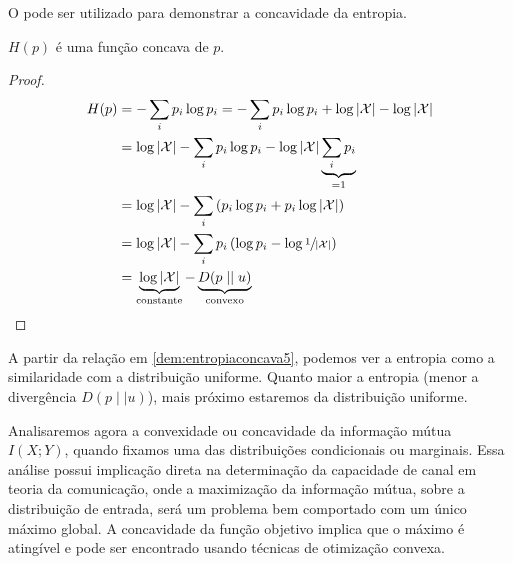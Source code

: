 O  pode ser utilizado para demonstrar a concavidade da entropia.
\begin{theorem}\label{thm:entropiaconcava}
$H(p)$ é uma função concava de $p$.
\end{theorem}
\begin{proof}
\begin{subequations}\label{dem:entropiaconcava}
\begin{align}
    H(p) &= - \sum_i p_i \log p_i = - \sum_i p_i \log p_i  + \log \vert \mathcal{X} \vert - \log \vert \mathcal{X} \vert \label{dem:entropiaconcava1}\\
        &= \log \vert \mathcal{X} \vert - \sum_i p_i \log p_i - \log \vert \mathcal{X} \vert \underbrace{\sum_i p_i}_{=1} \label{dem:entropiaconcava2}\\
        &= \log \vert \mathcal{X} \vert - \sum_i \left( p_i \log p_i + p_i \log \vert \mathcal{X} \vert \right) \label{dem:entropiaconcava3}\\
        &= \log \vert \mathcal{X} \vert - \sum_i p_i \left( \log p_i -  \log \sfrac{1}{\vert \mathcal{X} \vert } \right) \label{dem:entropiaconcava4}\\
        &= \underbrace{\log \vert \mathcal{X} \vert}_{\text{constante}} - \underbrace{D(p \mid\mid u)}_{\text{convexo}} \label{dem:entropiaconcava5}
\end{align}
\end{subequations}
\end{proof}
A partir da relação em \ref{dem:entropiaconcava5}, podemos ver a entropia como a similaridade com a distribuição uniforme.
Quanto maior a entropia (menor a divergência $D(p \mid\mid u)$), mais próximo estaremos da distribuição uniforme.


Analisaremos agora a convexidade ou concavidade da informação mútua $I(X;Y)$, quando fixamos uma das distribuições condicionais ou marginais.
Essa análise possui implicação direta na determinação da capacidade de canal em teoria da comunicação, onde a maximização da informação mútua,
sobre a distribuição de entrada, será um problema bem comportado com um único máximo global. A concavidade da função objetivo
implica que o máximo é atingível e pode ser encontrado usando técnicas de otimização convexa.

